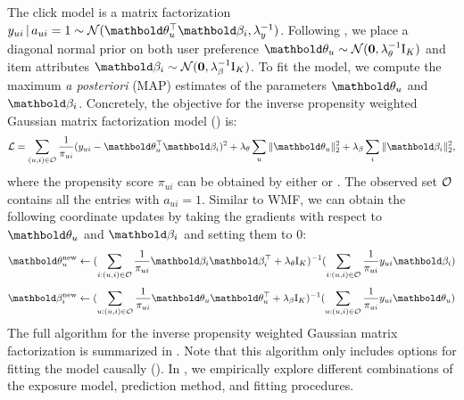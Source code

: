 The click model is a matrix factorization $y_{ui} \g a_{ui} = 1 \sim \cN(\mb\theta_u^\top \mb\beta_i, \lambda_y^{-1})$.
Following , we place a diagonal normal prior on both user preference
$\mb\theta_u \sim \mathcal{N}(\bzero, \lambda_\theta^{-1} \mathrm{I}_K)$ and
item attributes
$\mb\beta_i \sim \mathcal{N}(\bzero, \lambda_\beta^{-1}\mathrm{I}_K)$. To fit the model, we compute the maximum \emph{a posteriori} (MAP)
estimates of the parameters $\mb\theta_u$ and $\mb\beta_i$. Concretely, the objective for the inverse propensity weighted Gaussian matrix factorization model () is:
\begin{equation*}
\cL = \sum_{(u, i)\in \cO} \frac{1}{\pi_{ui}}(y_{ui} - \mb\theta_u^\top\mb\beta_i)^2 + \lambda_\theta \sum_u \|\mb\theta_u \|^2_2 + \lambda_\beta \sum_i \|\mb\beta_i \|_2^2,
\label{chpt:causal_rec:eq:gmf_logll}
\end{equation*}
where the propensity score $\pi_{ui}$ can be obtained by either  or . The observed set $\mathcal{O}$ contains all the entries with $a_{ui} = 1$. Similar to \gls{WMF}, we can obtain the following coordinate updates by taking the gradients with respect to $\mb\theta_u$ and $\mb\beta_i$ and setting them to 0:
\begin{equation}
\mb\theta_u^\new \leftarrow (\sum_{i: (u, i) \in \cO} \frac{1}{\pi_{ui}}\mb\beta_i \mb\beta_i^\top + \lambda_\theta \mathrm{I}_K)^{-1} (\sum_{i: (u, i) \in \cO} \frac{1}{\pi_{ui}} y_{ui} \mb\beta_i)
\label{chpt:causal_rec:eq:als_user}
\end{equation}
\begin{equation}
\mb\beta_i^\new \leftarrow (\sum_{u: (u, i)\in\cO} \frac{1}{\pi_{ui}}\mb\theta_u \mb\theta_u^\top + \lambda_\beta \mathrm{I}_K)^{-1} (\sum_{u: (u, i)\in\cO} \frac{1}{\pi_{ui}}y_{ui} \mb\theta_u)
\label{chpt:causal_rec:eq:als_item}
\end{equation}
The full algorithm for the inverse propensity weighted Gaussian matrix factorization is summarized in . Note that this algorithm only includes options for fitting the model causally (). In , we empirically explore different combinations of the exposure model, prediction method, and fitting procedures.


